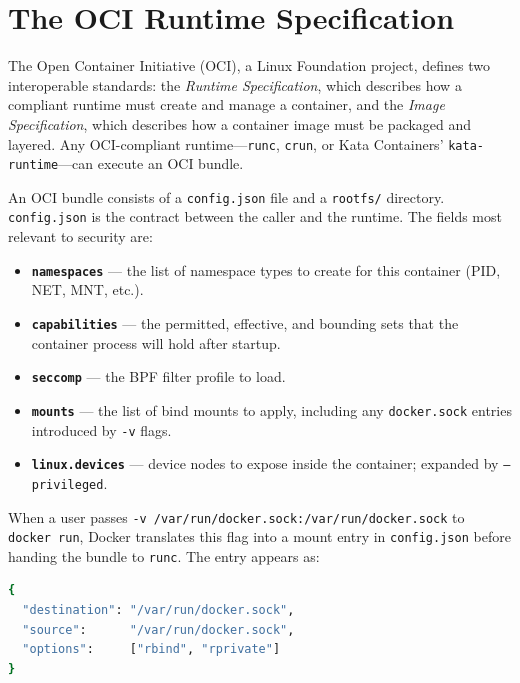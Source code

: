 \section{The OCI Runtime Specification}

The Open Container Initiative (OCI), a Linux Foundation project, defines two
interoperable standards: the \textit{Runtime Specification}, which describes how a
compliant runtime must create and manage a container, and the \textit{Image
Specification}, which describes how a container image must be packaged and layered.
Any OCI-compliant runtime---\texttt{runc}, \texttt{crun}, or Kata Containers'
\texttt{kata-runtime}---can execute an OCI bundle.

An OCI bundle consists of a \texttt{config.json} file and a \texttt{rootfs/}
directory. \texttt{config.json} is the contract between the caller and the runtime.
The fields most relevant to security are:

\begin{itemize}
    \item \textbf{\texttt{namespaces}} --- the list of namespace types to create for
          this container (PID, NET, MNT, etc.).
    \item \textbf{\texttt{capabilities}} --- the permitted, effective, and bounding
          sets that the container process will hold after startup.
    \item \textbf{\texttt{seccomp}} --- the BPF filter profile to load.
    \item \textbf{\texttt{mounts}} --- the list of bind mounts to apply, including
          any \texttt{docker.sock} entries introduced by \texttt{-v} flags.
    \item \textbf{\texttt{linux.devices}} --- device nodes to expose inside the
          container; expanded by \texttt{--privileged}.
\end{itemize}

When a user passes \texttt{-v /var/run/docker.sock:/var/run/docker.sock} to
\texttt{docker run}, Docker translates this flag into a mount entry in
\texttt{config.json} before handing the bundle to \texttt{runc}. The entry appears
as:

\begin{lstlisting}[language=bash]
{
  "destination": "/var/run/docker.sock",
  "source":      "/var/run/docker.sock",
  "options":     ["rbind", "rprivate"]
}
\end{lstlisting}

